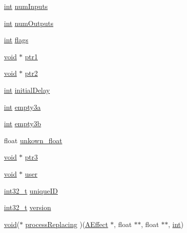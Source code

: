 \begin{DoxyCompactItemize}
\item 
\hyperlink{xmltok_8h_a5a0d4a5641ce434f1d23533f2b2e6653}{int} \hyperlink{class_a_effect_a2664ad3fdd5f3ae476f183bf453744bf}{num\+Inputs}
\item 
\hyperlink{xmltok_8h_a5a0d4a5641ce434f1d23533f2b2e6653}{int} \hyperlink{class_a_effect_a11d3a0c5805abeed61b74e56a2b0cb24}{num\+Outputs}
\item 
\hyperlink{xmltok_8h_a5a0d4a5641ce434f1d23533f2b2e6653}{int} \hyperlink{class_a_effect_a443cb28fecb734ad4ed7adb7edda2a36}{flags}
\item 
\hyperlink{sound_8c_ae35f5844602719cf66324f4de2a658b3}{void} $\ast$ \hyperlink{class_a_effect_a1acdc1cf1f6e217bbaecdd6e5227c49a}{ptr1}
\item 
\hyperlink{sound_8c_ae35f5844602719cf66324f4de2a658b3}{void} $\ast$ \hyperlink{class_a_effect_a0f6b5b9b80ea1e911ea5e96b940e4f63}{ptr2}
\item 
\hyperlink{xmltok_8h_a5a0d4a5641ce434f1d23533f2b2e6653}{int} \hyperlink{class_a_effect_a42fb0646943502b8f3a3585f05c0a29d}{initial\+Delay}
\item 
\hyperlink{xmltok_8h_a5a0d4a5641ce434f1d23533f2b2e6653}{int} \hyperlink{class_a_effect_a0ef99daaaf1472626919f4c53c05ade2}{empty3a}
\item 
\hyperlink{xmltok_8h_a5a0d4a5641ce434f1d23533f2b2e6653}{int} \hyperlink{class_a_effect_a2ec83e43a8583472013bc62cf285beaa}{empty3b}
\item 
float \hyperlink{class_a_effect_a6532e10970843e93f6da4b283a579a42}{unkown\+\_\+float}
\item 
\hyperlink{sound_8c_ae35f5844602719cf66324f4de2a658b3}{void} $\ast$ \hyperlink{class_a_effect_a1466e69ea4be20365c021ee250edcab0}{ptr3}
\item 
\hyperlink{sound_8c_ae35f5844602719cf66324f4de2a658b3}{void} $\ast$ \hyperlink{class_a_effect_aee5789fd3f0301cbfc91c97760291783}{user}
\item 
\hyperlink{lib-src_2ffmpeg_2win32_2stdint_8h_a37994e3b11c72957c6f454c6ec96d43d}{int32\+\_\+t} \hyperlink{class_a_effect_a91cc3890b73363e04b792f62a8826616}{unique\+ID}
\item 
\hyperlink{lib-src_2ffmpeg_2win32_2stdint_8h_a37994e3b11c72957c6f454c6ec96d43d}{int32\+\_\+t} \hyperlink{class_a_effect_a15e8ddd47fc0c051f4b57a79c97b48f1}{version}
\item 
\hyperlink{sound_8c_ae35f5844602719cf66324f4de2a658b3}{void}($\ast$ \hyperlink{class_a_effect_a13bd3d939086f0c3aeab85e4265ff94b}{process\+Replacing} )(\hyperlink{class_a_effect}{A\+Effect} $\ast$, float $\ast$$\ast$, float $\ast$$\ast$, \hyperlink{xmltok_8h_a5a0d4a5641ce434f1d23533f2b2e6653}{int})
\end{DoxyCompactItemize}



